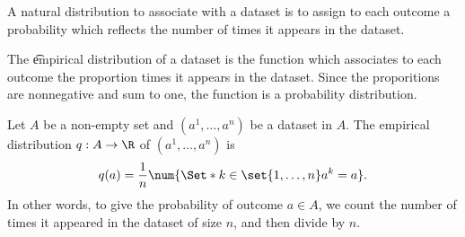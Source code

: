 

A natural distribution to associate with a dataset is to assign to each outcome a probability which reflects the number of times it appears in the dataset.


The \t{empirical distribution} of a dataset is the function which associates to each outcome the proportion times it appears in the dataset.
Since the proporitions are nonnegative and sum to one, the function is a probability distribution.


Let $A$ be a non-empty set and $(a^1, \dots, a^n)$ be a dataset in $A$.
The empirical distribution $q: A \to \R$ of $(a^1, \dots, a^n)$ is
  \[
q(a) = \frac{1}{n} \num{\Set*{k \in \set{1, \dots, n}}{a^k = a}}.
  \]
In other words, to give the probability of outcome $a \in A$, we count the number of times it appeared in the dataset of size $n$, and then divide by $n$.

\blankpage
